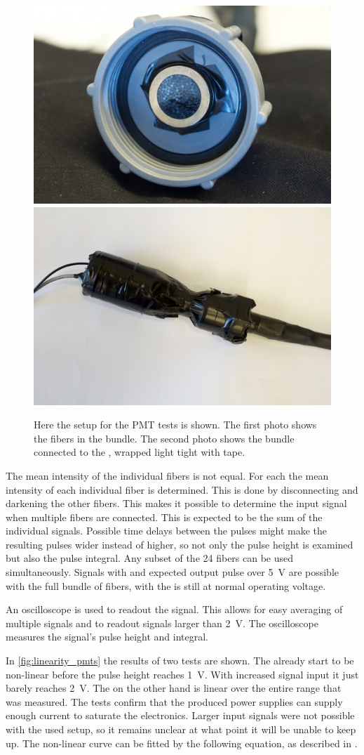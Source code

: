 \begin{figure}
    \centering
    \includegraphics[width=.45\linewidth]{plots/detector/ARN_085351.jpg}
    \includegraphics[width=.45\linewidth]{plots/detector/ARN_085349.jpg}
    \caption{Here the setup for the PMT tests is shown. The first photo shows the fibers in the bundle. The second photo shows the bundle connected to the \pmt, wrapped light tight with tape.}
    \label{fig:pmt_test_setup}
\end{figure}

The mean intensity of the individual fibers is not equal. For each \pmt the mean intensity of each individual fiber is determined. This is done by disconnecting and darkening the other fibers. This makes it possible to determine the input signal when multiple fibers are connected. This is expected to be the sum of the individual signals. Possible time delays between the pulses might make the resulting pulses wider instead of higher, so not only the pulse height is examined but also the pulse integral. Any subset of the 24 fibers can be used simultaneously. Signals with and expected \pmt output pulse over \SI{5}{\volt} are possible with the full bundle of fibers, with the \pmt is still at normal operating voltage.

An oscilloscope is used to readout the \pmt signal. This allows for easy averaging of multiple signals and to readout signals larger than \SI{2}{\volt}. The oscilloscope measures the signal's pulse height and integral.

In \cref{fig:linearity_pmts} the results of two \pmt tests are shown. The \senstech \pmt already start to be non-linear before the pulse height reaches \SI{1}{\volt}. With increased signal input it just barely reaches \SI{2}{\volt}. The \nikhef \pmt on the other hand is linear over the entire range that was measured. The tests confirm that the \nikhef produced \pmt power supplies can supply enough current to saturate the \hisparc electronics. Larger input signals were not possible with the used setup, so it remains unclear at what point it will be unable to keep up. The non-linear curve can be fitted by the following equation, as described in \cite{icecube2010pmt}.

